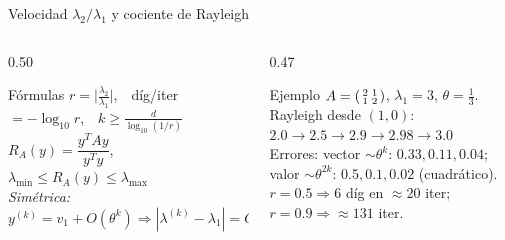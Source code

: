 \documentclass[aspectratio=169,10pt]{beamer}
\begin{document}
\begin{frame}{Velocidad $\lambda_2/\lambda_1$ y cociente de Rayleigh}
\begin{columns}[T]
\begin{column}{0.50\textwidth}
\begin{cardidea}{Fórmulas}{\faSuperscript}
{\footnotesize $r=\big|\tfrac{\lambda_2}{\lambda_1}\big|$,\ \ díg/iter $=-\log_{10}r$,\ \ $k\ge\tfrac{d}{\log_{10}(1/r)}$\\[1.4mm]
$R_A(y)=\dfrac{y^TAy}{y^Ty}$,\ \ $\lambda_{\min}\le R_A(y)\le\lambda_{\max}$\\[1.2mm]
\emph{Simétrica:} $y^{(k)}=v_1+O(\theta^k)\Rightarrow|\lambda^{(k)}-\lambda_1|=O(\theta^{2k})$}
\end{cardidea}
\end{column}
\begin{column}{0.47\textwidth}
\begin{cardgear}{Ejemplo}{\faCalculator}
{\footnotesize $A=\begin{psmallmatrix}2&1\\1&2\end{psmallmatrix}$, $\lambda_1=3$, $\theta=\tfrac13$. Rayleigh desde $(1,0)$:\\[0.8mm]
$2.0\to2.5\to2.9\to2.98\to\mathbf{3.0}$\\[1.2mm]
Errores: vector $\sim\theta^k$: $0.33,0.11,0.04$;\\
valor $\sim\theta^{2k}$: $0.5,0.1,0.02$ (cuadrático).\\[1mm]
$r=0.5\Rightarrow 6$ díg en $\approx20$ iter; $r=0.9\Rightarrow\approx131$ iter.}
\end{cardgear}
\end{column}
\end{columns}
\end{frame}
\end{document}
